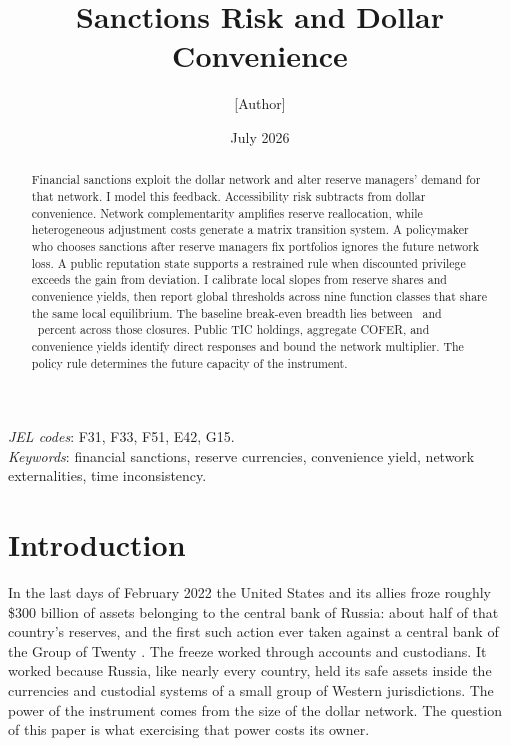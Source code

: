 \documentclass[11pt]{article}
\title{Sanctions Risk and Dollar Convenience}
\author{[Author]}
\date{July 2026}
\theoremstyle{definition}
\begin{document}
\maketitle

\begin{abstract}
\noindent Financial sanctions exploit the dollar network and alter reserve managers' demand for that network. I model this feedback. Accessibility risk subtracts from dollar convenience. Network complementarity amplifies reserve reallocation, while heterogeneous adjustment costs generate a matrix transition system. A policymaker who chooses sanctions after reserve managers fix portfolios ignores the future network loss. A public reputation state supports a restrained rule when discounted privilege exceeds the gain from deviation. I calibrate local slopes from reserve shares and convenience yields, then report global thresholds across nine function classes that share the same local equilibrium. The baseline break-even breadth lies between \PBEClosureLow\ and \PBEClosureHigh\ percent across those closures. Public TIC holdings, aggregate COFER, and convenience yields identify direct responses and bound the network multiplier. The policy rule determines the future capacity of the instrument.
\end{abstract}

\medskip
\noindent\textit{JEL codes}: F31, F33, F51, E42, G15.\\
\noindent\textit{Keywords}: financial sanctions, reserve currencies, convenience yield, network externalities, time inconsistency.

\section{Introduction}\label{sec:intro}

In the last days of February 2022 the United States and its allies froze roughly \$300 billion of assets belonging to the central bank of Russia: about half of that country's reserves, and the first such action ever taken against a central bank of the Group of Twenty \citep{BrookingsRussiaAssets2025}. The freeze worked through accounts and custodians. It worked because Russia, like nearly every country, held its safe assets inside the currencies and custodial systems of a small group of Western jurisdictions. The power of the instrument comes from the size of the dollar network. The question of this paper is what exercising that power costs its owner.
\end{document}
